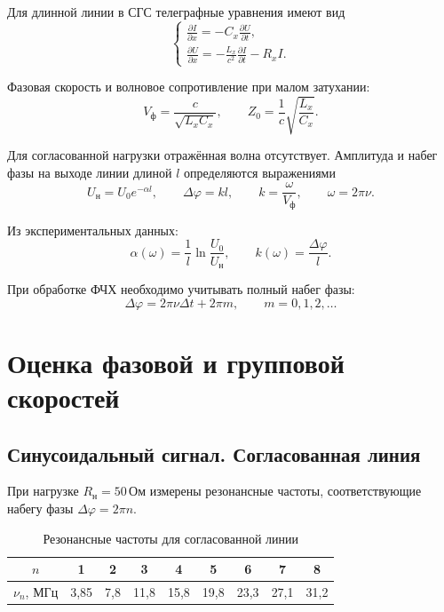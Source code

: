 \documentclass[a4paper,14pt]{extarticle}
\begin{document}
Для длинной линии в СГС телеграфные уравнения имеют вид
\begin{equation}
    \begin{cases}
        \displaystyle \frac{\partial I}{\partial x}
            =-C_x\frac{\partial U}{\partial t},\\[2mm]
        \displaystyle \frac{\partial U}{\partial x}
            =-\frac{L_x}{c^2}\frac{\partial I}{\partial t}-R_x I.
    \end{cases}
\end{equation}

Фазовая скорость и волновое сопротивление при малом затухании:
\begin{equation}
    V_{\text{ф}}=\frac{c}{\sqrt{L_x C_x}},
    \qquad
    Z_0=\frac{1}{c}\sqrt{\frac{L_x}{C_x}}.
\end{equation}

Для согласованной нагрузки отражённая волна отсутствует. Амплитуда
и набег фазы на выходе линии длиной $l$ определяются выражениями
\begin{equation}
    U_{\text{н}}=U_0e^{-\alpha l},
    \qquad
    \Delta\varphi=kl,
    \qquad
    k=\frac{\omega}{V_{\text{ф}}},
    \qquad \omega=2\pi\nu.
\end{equation}

Из экспериментальных данных:
\begin{equation}
    \alpha(\omega)=\frac{1}{l}\ln\frac{U_0}{U_{\text{н}}},
    \qquad
    k(\omega)=\frac{\Delta\varphi}{l}.
\end{equation}

При обработке ФЧХ необходимо учитывать полный набег фазы:
\begin{equation}
    \Delta\varphi=2\pi\nu\Delta t+2\pi m,
    \qquad m=0,1,2,\ldots
\end{equation}

\section{Оценка фазовой и групповой скоростей}

\subsection{Синусоидальный сигнал. Согласованная линия}
При нагрузке $R_{\text{н}}=50\,\text{Ом}$ измерены резонансные частоты,
соответствующие набегу фазы $\Delta\varphi=2\pi n$.

\begin{table}[H]
    \centering
    \caption{Резонансные частоты для согласованной линии}
    \begin{tabular}{ccccccccc}
        \toprule
        $n$ & 1 & 2 & 3 & 4 & 5 & 6 & 7 & 8\\
        \midrule
        $\nu_n$, МГц & 3,85 & 7,8 & 11,8 & 15,8 & 19,8 & 23,3 & 27,1 & 31,2\\
        \bottomrule
    \end{tabular}
\end{table}
\end{document}
